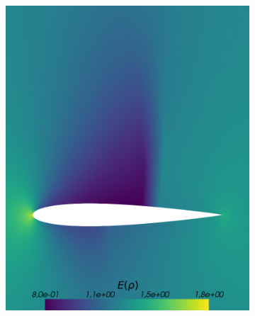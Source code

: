 \begin{figure}[h!]
\centering
	\begin{subfigure}{0.3\linewidth}
		\centering
		\includegraphics[scale=0.2]{figs/Euler1DPlots10/euler2D_nacaCoarse_refadosipm_n2-9_sg2-4_s05_aoa_oneRet_ERho.png}
		\label{fig:sub1}
	\end{subfigure}%
	\hfill
	\begin{subfigure}{0.3\linewidth}
		\centering

\end{subfigure}
\end{figure}
